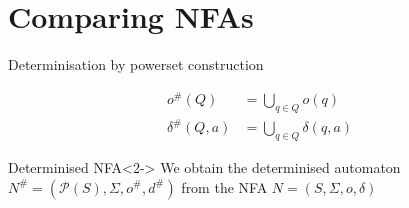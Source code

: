 \documentclass[compress]{beamer}
\begin{document}


\section{Comparing NFAs}

\begin{frame}{Determinisation by powerset construction}
  \begin{figure}
    \begin{align*}
      o^\#(Q) &= \bigcup_{q \in Q} o(q)\\
      \delta^\#(Q, a) &= \bigcup_{q \in Q} \delta(q, a)
    \end{align*}
  \end{figure}

  \begin{block}{Determinised NFA}<2->
    We obtain the determinised automaton $N^\# = (\mathcal{P}(S), \Sigma, o^{\#}, d^{\#})$
      from the NFA $N = (S, \Sigma, o, \delta)$
  \end{block}
\end{frame}
\end{document}
